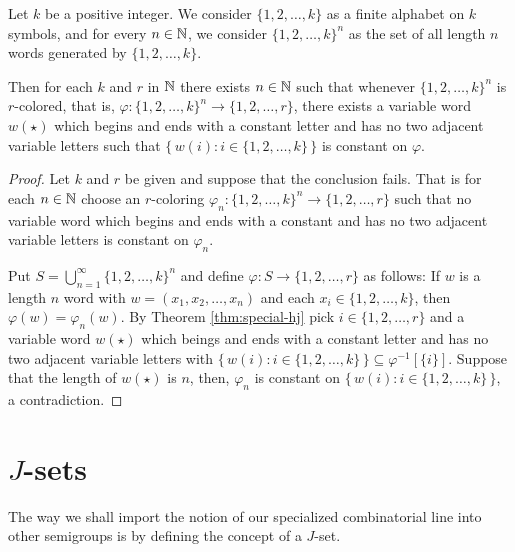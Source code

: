 \begin{thm}
  \label{thm:finitary-shj}
  Let $k$ be a positive integer.
  We consider $\{1, 2, \ldots, k\}$ as a finite alphabet on $k$ symbols, and for every $n \in \mathbb{N}$, we consider $\{1, 2, \ldots, k\}^n$ as the set of all length $n$ words generated by $\{1, 2, \ldots, k\}$.

  Then for each $k$ and $r$ in $\mathbb{N}$ there exists $n \in \mathbb{N}$ such that whenever $\{1, 2, \ldots, k\}^n$ is $r$-colored, that is, $\varphi \colon \{1, 2, \ldots, k\}^n \to \{1, 2, \ldots, r\}$, there exists a variable word $w(\star)$ which begins and ends with a constant letter and has no two adjacent variable letters such that $\bigl\{\, w(i) : i \in \{1, 2, \ldots, k\} \,\bigr\}$ is constant on $\varphi$.
\end{thm}
\begin{proof}
  Let $k$ and $r$ be given and suppose that the conclusion fails.
  That is for each $n \in \mathbb{N}$ choose an $r$-coloring $\varphi_n \colon \{1, 2, \ldots, k\}^n \to \{1, 2, \ldots, r\}$ such that no variable word which begins and ends with a constant and has no two adjacent variable letters is constant on $\varphi_n$.
  
  Put $S = \bigcup_{n=1}^\infty \{1, 2, \ldots, k\}^n$ and define $\varphi \colon S \to \{1, 2, \ldots, r\}$ as follows: If $w$ is a length $n$ word with $w = (x_1, x_2, \ldots, x_n)$ and each $x_i \in \{1, 2, \ldots, k\}$, then $\varphi(w) = \varphi_n(w)$.
  By Theorem \ref{thm:special-hj} pick $i \in \{1, 2, \ldots, r\}$ and a variable word $w(\star)$ which beings and ends with a constant letter and has no two adjacent variable letters with $\bigl\{\, w(i) : i \in \{1, 2, \ldots, k\} \,\bigr\} \subseteq \varphi^{-1}[\{i\}]$.
  Suppose that the length of $w(\star)$ is $n$, then, $\varphi_n$ is constant on $\bigl\{\, w(i) : i \in \{1, 2, \ldots, k\} \,\bigr\}$, a contradiction. 
\end{proof}

\section{$J$-sets}
The way we shall import the notion of our specialized combinatorial line into other semigroups is by defining the concept of a $J$-set. 

